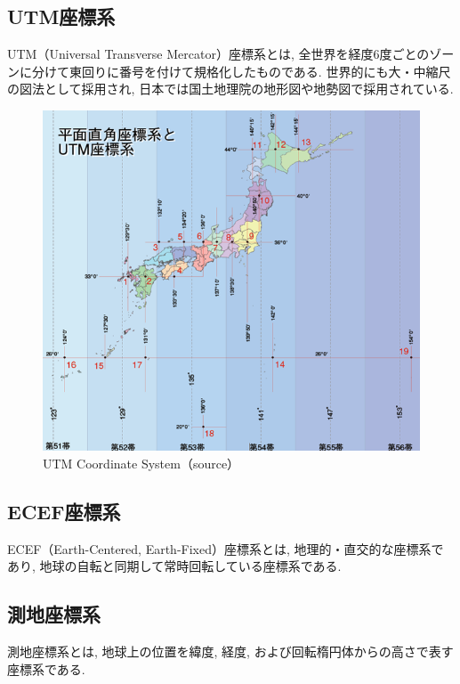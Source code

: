 \subsection{UTM座標系}
UTM（Universal Transverse Mercator）座標系とは, 全世界を経度6度ごとのゾーンに分けて東回りに番号を付けて規格化したものである.
世界的にも大・中縮尺の図法として採用され, 日本では国土地理院の地形図や地勢図で採用されている.

\begin{figure}[H]
  \centering
 \includegraphics[keepaspectratio, scale=0.7]
      {images/UTMCoordinateSystem.png}
 \caption{UTM Coordinate System（source）}
 \label{fig:UTM}
\end{figure}


\subsection{ECEF座標系}
ECEF（Earth-Centered, Earth-Fixed）座標系とは, 地理的・直交的な座標系であり, 地球の自転と同期して常時回転している座標系である.

\subsection{測地座標系}
測地座標系とは, 地球上の位置を緯度, 経度, および回転楕円体からの高さで表す座標系である.

